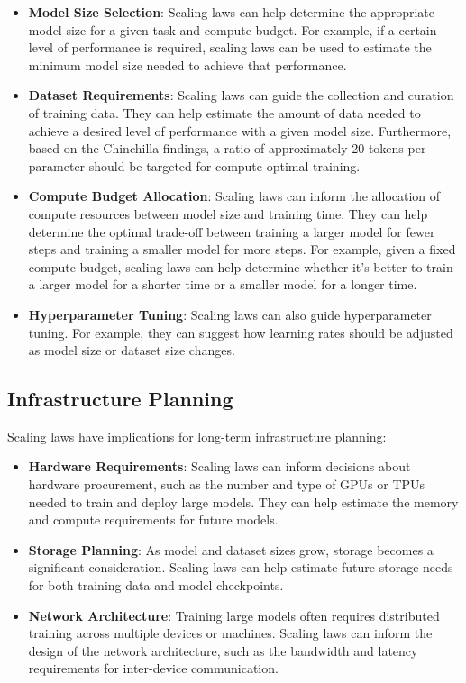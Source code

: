 \begin{itemize}[noitemsep]
    \item \textbf{Model Size Selection}:  Scaling laws can help determine the appropriate model size for a given task and compute budget. For example, if a certain level of performance is required, scaling laws can be used to estimate the minimum model size needed to achieve that performance.
    \item \textbf{Dataset Requirements}:  Scaling laws can guide the collection and curation of training data. They can help estimate the amount of data needed to achieve a desired level of performance with a given model size. Furthermore, based on the Chinchilla findings, a ratio of approximately 20 tokens per parameter should be targeted for compute-optimal training.
    \item \textbf{Compute Budget Allocation}:  Scaling laws can inform the allocation of compute resources between model size and training time. They can help determine the optimal trade-off between training a larger model for fewer steps and training a smaller model for more steps. For example, given a fixed compute budget, scaling laws can help determine whether it's better to train a larger model for a shorter time or a smaller model for a longer time.
    \item \textbf{Hyperparameter Tuning}: Scaling laws can also guide hyperparameter tuning. For example, they can suggest how learning rates should be adjusted as model size or dataset size changes.
\end{itemize}

\subsection{Infrastructure Planning}
\noindent
Scaling laws have implications for long-term infrastructure planning:

\begin{itemize}[noitemsep]
    \item \textbf{Hardware Requirements}:  Scaling laws can inform decisions about hardware procurement, such as the number and type of GPUs or TPUs needed to train and deploy large models. They can help estimate the memory and compute requirements for future models.
    \item \textbf{Storage Planning}:  As model and dataset sizes grow, storage becomes a significant consideration. Scaling laws can help estimate future storage needs for both training data and model checkpoints.
    \item \textbf{Network Architecture}:  Training large models often requires distributed training across multiple devices or machines. Scaling laws can inform the design of the network architecture, such as the bandwidth and latency requirements for inter-device communication.
\end{itemize}

